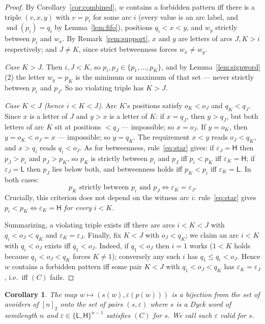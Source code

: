 \documentclass[11pt]{article}
\newtheorem{corollary}[theorem]{Corollary}
\theoremstyle{definition}
\theoremstyle{remark}
\newcommand{\nn}{[n]_2}
\DeclareMathOperator{\snd}{snd}
\newcommand{\sL}{\mathsf{L}}
\newcommand{\sH}{\mathsf{H}}
\begin{document}
\begin{proof}
By Corollary~\ref{cor:combined}, $w$ contains a forbidden pattern iff there
is a triple $(v,x,y)$ with $v=p_i$ for some arc $i$ (every value is an arc
label, and $\snd(p_i)=q_i$ by Lemma~\ref{lem:fifo}), positions
$q_i<x<y$, and $w_y$ strictly between $p_i$ and $w_x$. By
Remark~\ref{rem:support}, $x$ and $y$ are letters of arcs $J,K>i$
respectively; and $J\neq K$, since strict betweenness forces
$w_x\neq w_y$.

\emph{Case $K>J$.} Then $i,J<K$, so $p_i,p_J\in\{p_1,\dots,p_K\}$, and by
Lemma~\ref{lem:signword}(2) the letter $w_y=p_K$ is the minimum or maximum
of that set --- never strictly between $p_i$ and $p_J$. So no violating
triple has $K>J$.

\emph{Case $K<J$ (hence $i<K<J$).} Arc $K$'s positions satisfy $o_K<o_J$ and
$q_K<q_J$. Since $x$ is a letter of $J$ and $y>x$ is a letter of $K$: if
$x=q_J$, then $y>q_J$, but both letters of arc $K$ sit at positions
$<q_J$ --- impossible; so $x=o_J$. If $y=o_K$, then $y=o_K<o_J=x$ ---
impossible; so $y=q_K$. The requirement $x<y$ reads $o_J<q_K$, and $x>q_i$
reads $q_i<o_J$. As for betweenness, rule~\eqref{eq:star} gives: if
$\varepsilon_J=\sH$ then $p_J>p_i$ and $p_J>p_K$, so $p_K$ is strictly
between $p_i$ and $p_J$ iff $p_i<p_K$ iff $\varepsilon_K=\sH$; if
$\varepsilon_J=\sL$ then $p_J$ lies below both, and betweenness holds iff
$p_K<p_i$ iff $\varepsilon_K=\sL$. In both cases:
\[
  p_K \text{ strictly between } p_i \text{ and } p_J
  \iff \varepsilon_K=\varepsilon_J .
\]
Crucially, this criterion does not depend on the witness arc $i$:
rule~\eqref{eq:star} gives $p_i<p_K\iff\varepsilon_K=\sH$ \emph{for every}
$i<K$.

Summarizing, a violating triple exists iff there are arcs $i<K<J$ with
$q_i<o_J<q_K$ and $\varepsilon_K=\varepsilon_J$. Finally, fix $K<J$ with
$o_J<q_K$; we claim an arc $i<K$ with $q_i<o_J$ exists iff $q_1<o_J$.
Indeed, if $q_1<o_J$ then $i=1$ works ($1<K$ holds because
$q_1<o_J<q_K$ forces $K\neq1$); conversely any such $i$ has
$q_1\le q_i<o_J$. Hence $w$ contains a forbidden pattern iff some pair
$K<J$ with $q_1<o_J<q_K$ has $\varepsilon_K=\varepsilon_J$, i.e.\ iff $(C)$
fails.
\end{proof}

\begin{corollary}\label{cor:pairs}
The map $w\mapsto(s(w),\varepsilon(p(w)))$ is a bijection from the set of
avoiders of $\nn$ onto the set of pairs $(s,\varepsilon)$ where $s$ is a
Dyck word of semilength $n$ and $\varepsilon\in\{\sL,\sH\}^{n-1}$ satisfies
$(C)$ for $s$. We call such $\varepsilon$ \emph{valid for $s$}.
\end{corollary}
\end{document}
